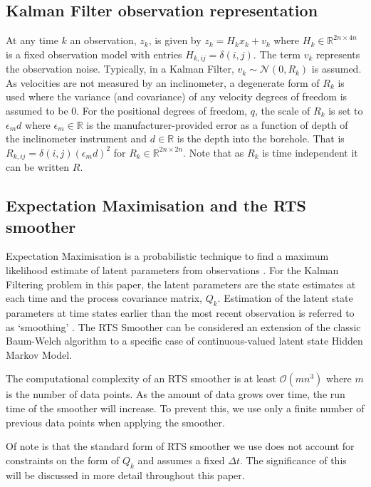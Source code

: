 \documentclass[pamm,a4paper,fleqn]{w-art}
\begin{document}
\subsection{Kalman Filter observation representation}

At any time $k$ an observation, $z_k$, is given by $z_k = H_k x_k + v_k$ where $H_k \in \mathbb{R}^{2n\times 4n}$ is a fixed observation model with entries $H_{k,ij} = \delta(i,j)$. The term $v_k$ represents the observation noise. Typically, in a Kalman Filter, $v_k \sim \mathcal{N}(0, R_k)$ is assumed. As velocities are not measured by an inclinometer, a degenerate form of $R_k$ is used where the variance (and covariance) of any velocity degrees of freedom is assumed to be $0$. For the positional degrees of freedom, $q$, the scale of $R_k$ is set to $\epsilon_m d$ where $\epsilon_m \in \mathbb{R}$ is the manufacturer-provided error as a function of depth of the inclinometer instrument and $d \in \mathbb{R}$ is the depth into the borehole. That is $R_{k,ij} = \delta(i,j) (\epsilon_m d)^2$ for $R_{k} \in \mathbb{R}^{2n \times 2n}$. Note that as $R_k$ is time independent it can be written $R$.


\subsection{Expectation Maximisation and the RTS smoother}

Expectation Maximisation is a probabilistic technique to find a maximum likelihood estimate of latent parameters from observations \cite{murphy2012machine}. For the Kalman Filtering problem in this paper, the latent parameters are the state estimates at each time and the process covariance matrix, $Q_k$. Estimation of the latent state parameters at time states earlier than the most recent observation is referred to as `smoothing' \cite{murphy2012machine}. The RTS Smoother \cite{rauch1965maximum} can be considered an extension of the classic Baum-Welch algorithm \cite{russell2010artificial} to a specific case of continuous-valued latent state Hidden Markov Model. 

The computational complexity of an RTS smoother is at least $\mathcal{O}(m n^3)$ where $m$ is the number of data points. As the amount of data grows over time, the run time of the smoother will increase. To prevent this, we use only a finite number of previous data points when applying the smoother. 

Of note is that the standard form of RTS smoother we use does not account for constraints on the form of $Q_k$ and assumes a fixed $\Delta t$. The significance of this will be discussed in more detail throughout this paper.
\end{document}
